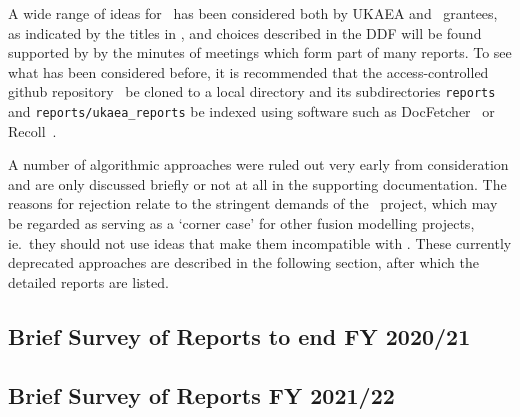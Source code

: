 A wide range of ideas for \nep \ has been considered both by UKAEA and \nep \ grantees,
as indicated by the titles in , and choices described in the DDF
will be found supported by by the minutes of meetings which form
part of many reports. To see what has been considered before, it is recommended that 
the access-controlled github repository~\cite{xpndocswebsite} be cloned to a
local directory and its subdirectories {\tt reports} and {\tt reports/ukaea\_reports}
be indexed using software such as DocFetcher~\cite{docfetcherwebsite} or Recoll~\cite{recollwebsite}.

A number of algorithmic approaches were ruled out very early from consideration
and are only discussed briefly or not at all in the supporting documentation.
The reasons for rejection relate to the stringent demands of the \nep \ project,
which may be regarded as serving as a `corner case' for other fusion modelling projects,
ie.\ they should not use ideas that make them incompatible with \nep.
These currently deprecated approaches are  described in the following section,
after which the detailed reports are listed. 





\subsection{Brief Survey of Reports to end FY 2020/21}\label{sec:summary}

\subsection{Brief Survey of Reports FY 2021/22}\label{sec:summary22}


 
